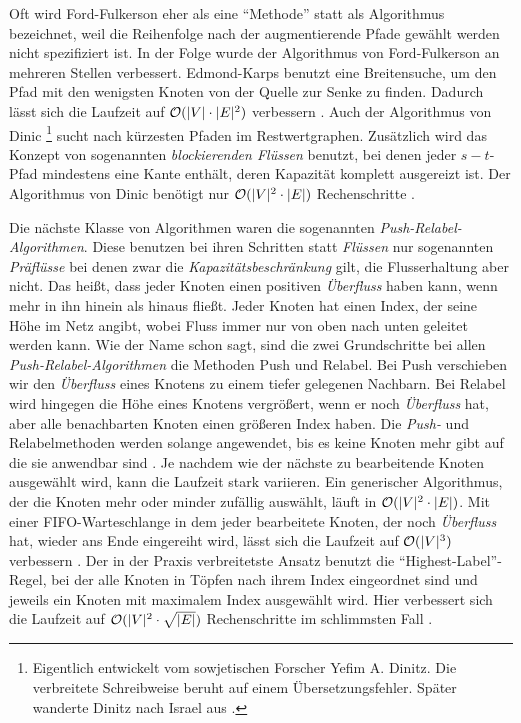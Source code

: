 Oft wird Ford-Fulkerson eher als eine \enquote{Methode} statt als Algorithmus bezeichnet, weil die Reihenfolge nach der augmentierende Pfade gewählt werden nicht spezifiziert ist. In der Folge wurde der Algorithmus von Ford-Fulkerson an mehreren Stellen verbessert. Edmond-Karps benutzt eine Breitensuche, um den Pfad mit den wenigsten Knoten von der Quelle zur Senke zu finden. Dadurch lässt sich die Laufzeit auf $\mathcal{O}(|V|\cdot |E|^2)$ verbessern \cite[S.727ff.]{clrs09}. Auch der Algorithmus von Dinic \footnote{Eigentlich entwickelt vom sowjetischen Forscher Yefim A. Dinitz. Die verbreitete Schreibweise beruht auf einem Übersetzungsfehler. Später wanderte Dinitz nach Israel aus \cite{d06}.} sucht nach kürzesten Pfaden im Restwertgraphen. Zusätzlich wird das Konzept von sogenannten \emph{blockierenden Flüssen} benutzt, bei denen jeder $s-t$-Pfad mindestens eine Kante enthält, deren Kapazität komplett ausgereizt ist. Der Algorithmus von Dinic benötigt nur $\mathcal{O}(|V|^2\cdot |E|)$ Rechenschritte \cite{d06}.

Die nächste Klasse von Algorithmen waren die sogenannten \emph{Push-Relabel-Algorithmen}. Diese benutzen bei ihren Schritten statt \emph{Flüssen} nur sogenannten \emph{Präflüsse} bei denen zwar die \emph{Kapazitätsbeschränkung} gilt, die Flusserhaltung aber nicht. Das heißt, dass jeder Knoten einen positiven \emph{Überfluss} haben kann, wenn mehr in ihn hinein als hinaus fließt. Jeder Knoten hat einen Index, der seine Höhe im Netz angibt, wobei Fluss immer nur von oben nach unten geleitet werden kann. Wie der Name schon sagt, sind die zwei Grundschritte bei allen \emph{Push-Relabel-Algorithmen} die Methoden Push und Relabel. Bei Push verschieben wir den \emph{Überfluss} eines Knotens zu einem tiefer gelegenen Nachbarn. Bei Relabel wird hingegen die Höhe eines Knotens vergrößert, wenn er noch \emph{Überfluss} hat, aber alle benachbarten Knoten einen größeren Index haben. Die \emph{Push-} und Relabelmethoden werden solange angewendet, bis es keine Knoten mehr gibt auf die sie anwendbar sind \cite[S.736ff.]{clrs09}. Je nachdem wie der nächste zu bearbeitende Knoten ausgewählt wird, kann die Laufzeit stark variieren. Ein generischer Algorithmus, der die Knoten mehr oder minder zufällig auswählt, läuft in $\mathcal{O}(|V|^2\cdot |E|)$. Mit einer FIFO-Warteschlange in dem jeder bearbeitete Knoten, der noch \emph{Überfluss} hat, wieder ans Ende eingereiht wird, lässt sich die Laufzeit auf $\mathcal{O}(|V|^3)$ verbessern \cite{gt88}. Der in der Praxis verbreitetste Ansatz benutzt die \enquote{Highest-Label}-Regel, bei der alle Knoten in Töpfen nach ihrem Index eingeordnet sind und jeweils ein Knoten mit maximalem Index ausgewählt wird. Hier verbessert sich die Laufzeit auf $\mathcal{O}(|V|^2\cdot \sqrt{|E|})$ Rechenschritte im schlimmsten Fall \cite{akmo97}.

